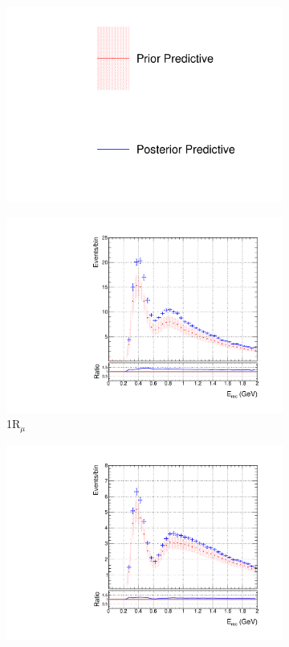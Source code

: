\begin{figure}[!htbp]
\centering
\begin{subfigure}{.95\textwidth}
  \centering
  \includegraphics[width=0.25\linewidth]{figs/skspecleg}
\end{subfigure}
\begin{subfigure}{.49\textwidth}
  \centering
  \includegraphics[width=0.95\linewidth]{figs/skspecpolynumu}
  \caption{1R$_{\mu}$}
\end{subfigure}
\begin{subfigure}{.49\textwidth}
  \centering
  \includegraphics[width=0.95\linewidth]{figs/skspecpolynumubar}

\end{subfigure}
\end{figure}
